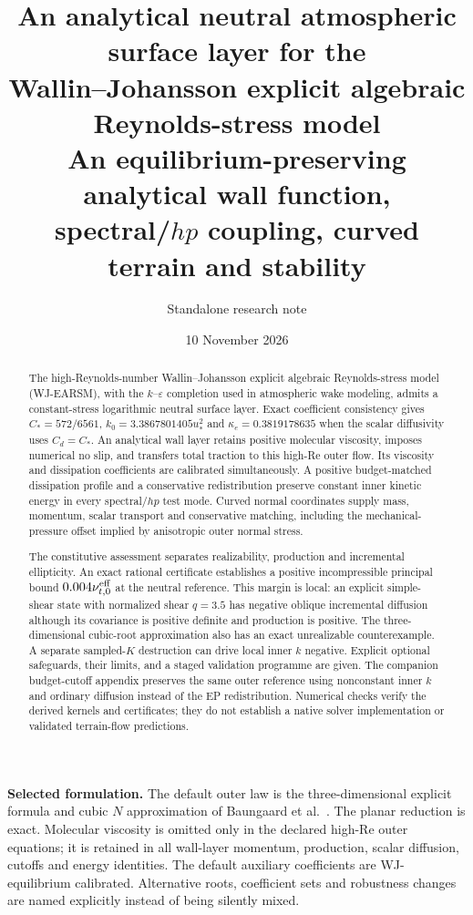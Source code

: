 \documentclass[11pt,a4paper]{article}
\title{\bfseries An analytical neutral atmospheric surface layer for the\\
Wallin--Johansson explicit algebraic Reynolds-stress model\\[4pt]
\large An equilibrium-preserving analytical wall function,\\
spectral/$hp$ coupling, curved terrain and stability}
\author{Standalone research note}
\date{10 November 2026}
\numberwithin{equation}{section}
\newcommand{\eps}{\varepsilon}
\begin{document}
\maketitle
\begin{abstract}
The high-Reynolds-number Wallin--Johansson explicit algebraic
Reynolds-stress model (WJ-EARSM), with the $k$--$\eps$ completion used in
atmospheric wake modeling, admits a constant-stress logarithmic neutral
surface layer. Exact coefficient consistency gives
$C_*=572/6561$, $k_0=3.3867801405u_*^2$ and
$\kappa_e=0.3819178635$ when the scalar diffusivity uses $C_d=C_*$.
An analytical wall layer retains positive molecular viscosity, imposes
numerical no slip, and transfers total traction to this high-Re outer
flow. Its viscosity and dissipation coefficients are calibrated
simultaneously. A positive budget-matched dissipation profile and a
conservative redistribution preserve constant inner kinetic energy in
every spectral/$hp$ test mode. Curved normal coordinates supply mass,
momentum, scalar transport and conservative matching, including the
mechanical-pressure offset implied by anisotropic outer normal stress.

The constitutive assessment separates realizability, production and
incremental ellipticity. An exact rational certificate establishes a
positive incompressible principal bound $0.004\nu_{t,0}^{\rm eff}$ at
the neutral reference. This margin is local: an explicit simple-shear
state with normalized shear $q=3.5$ has negative oblique incremental
diffusion although its covariance is positive definite and production
is positive. The three-dimensional cubic-root approximation also has
an exact unrealizable counterexample. A separate sampled-$K$
destruction can drive local inner $k$ negative. Explicit optional
safeguards, their limits, and a staged validation programme are given.
The companion budget-cutoff appendix preserves the same outer reference
using nonconstant inner $k$ and ordinary diffusion instead of the EP
redistribution. Numerical checks verify the derived kernels and
certificates; they do not establish a native solver implementation or
validated terrain-flow predictions.
\end{abstract}

\textbf{Selected formulation.}
The default outer law is the three-dimensional explicit formula and
cubic $N$ approximation of Baungaard et al.\ \cite{Baungaard2022}.
The planar reduction is exact. Molecular viscosity is omitted only in
the declared high-Re outer equations; it is retained in all wall-layer
momentum, production, scalar diffusion, cutoffs and energy identities.
The default auxiliary coefficients are WJ-equilibrium calibrated.
Alternative roots, coefficient sets and robustness changes are named
explicitly instead of being silently mixed.
\end{document}
